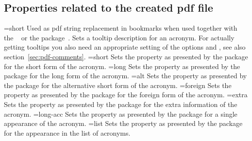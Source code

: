 \documentclass{acro-manual}
\begin{document}
\subsection{Properties related to the created \acs*{pdf} file}\label{sec:prop-relat-creat}
\begin{properties}
  \Initial={short}
    Used as \acs{pdf} string replacement in bookmarks when used together with
    the ~\cite{pkg:hyperref} or the 
    package~\cite{pkg:bookmark}.
    Sets a tooltip description for an acronym.  For actually getting
    tooltips you also need an appropriate setting of the options
     and , see also
    section~\vref{sec:pdf-comments}.
  \Initial={short}
    Sets the  property as presented by the 
    package for the short form of the acronym.
  \Initial={long}
    Sets the  property as presented by the 
    package for the long form of the acronym.
  \Initial={alt}
    Sets the  property as presented by the 
    package for the alternative short form of the acronym.
  \Initial={foreign}
    Sets the  property as presented by the 
    package for the foreign form of the acronym.
  \Initial={extra}
    Sets the  property as presented by the 
    package for the extra information of the acronym.
  \Initial={long-acc}
    Sets the  property as presented by the 
    package for a single appearance of the acronym.
  \Initial={list}
    Sets the  property as presented by the 
    package for the appearance in the list of acronyms.
\end{properties}
\end{document}
